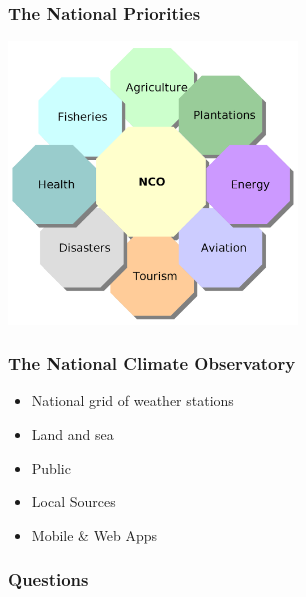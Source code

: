 \documentclass[serif,mathserif]{beamer}
\begin{document}

\begin{frame}
  \frametitle{The National Priorities}
\begin{center}
 \includegraphics[height=7.5cm]{Flower_sector.png}
\end{center}
\end{frame}



\begin{frame}
  \frametitle{The National Climate Observatory}
  \begin{itemize}
 \item National grid of weather stations
 \item Land and sea
 \item Public 
 \item Local Sources
 \item Mobile \& Web Apps
  \end{itemize}
\end{frame}


\begin{frame}
  \frametitle{Questions}
\end{frame}
\end{document}
